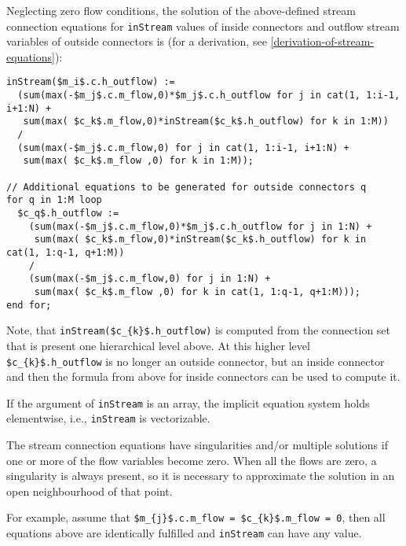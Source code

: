 Neglecting zero flow conditions, the solution of the above-defined
stream connection equations for \lstinline!inStream! values of inside connectors and
outflow stream variables of outside connectors is (for a derivation, see
\cref{derivation-of-stream-equations}):
\begin{lstlisting}[language=modelica]
inStream($m_i$.c.h_outflow) :=
  (sum(max(-$m_j$.c.m_flow,0)*$m_j$.c.h_outflow for j in cat(1, 1:i-1, i+1:N) +
   sum(max( $c_k$.m_flow,0)*inStream($c_k$.h_outflow) for k in 1:M))
  /
  (sum(max(-$m_j$.c.m_flow,0) for j in cat(1, 1:i-1, i+1:N) +
   sum(max( $c_k$.m_flow ,0) for k in 1:M));

// Additional equations to be generated for outside connectors q
for q in 1:M loop
  $c_q$.h_outflow :=
    (sum(max(-$m_j$.c.m_flow,0)*$m_j$.c.h_outflow for j in 1:N) +
     sum(max( $c_k$.m_flow,0)*inStream($c_k$.h_outflow) for k in cat(1, 1:q-1, q+1:M))
    /
    (sum(max(-$m_j$.c.m_flow,0) for j in 1:N) +
     sum(max( $c_k$.m_flow ,0) for k in cat(1, 1:q-1, q+1:M)));
end for;
\end{lstlisting}

\begin{nonnormative}
Note, that \lstinline!inStream($c_{k}$.h_outflow)! is computed from the connection set that is present one hierarchical level above.  At this higher level
\lstinline!$c_{k}$.h_outflow! is no longer an outside connector, but an inside connector and then the formula from above for inside connectors can be used
to compute it.
\end{nonnormative}

If the argument of \lstinline!inStream! is an array, the implicit
equation system holds elementwise, i.e., \lstinline!inStream! is
vectorizable.

The stream connection equations have singularities and/or multiple
solutions if one or more of the flow variables become zero. When all the
flows are zero, a singularity is always present, so it is necessary to
approximate the solution in an open neighbourhood of that point.

\begin{nonnormative}
For example, assume that \lstinline!$m_{j}$.c.m_flow = $c_{k}$.m_flow = 0!, then all equations above are identically fulfilled and \lstinline!inStream! can have any value.
\end{nonnormative}

